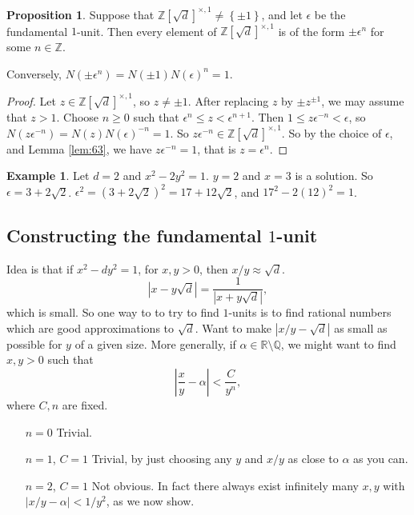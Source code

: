 \documentclass{article}
\newcommand{\Z}{\mathbb{Z}}
\newcommand{\Q}{\mathbb{Q}}
\newcommand{\R}{\mathbb{R}}
\newcommand{\rb}[1]{\left( #1 \right)}
\renewcommand{\sb}[1]{\left[ #1 \right]}
\newcommand{\cb}[1]{\left\{ #1 \right\}}
\newcommand{\abs}[1]{\left\lvert #1 \right\rvert}
\theoremstyle{definition}\newtheorem{definition}{Definition}
\theoremstyle{definition}\newtheorem{remark}[definition]{Remark}
\theoremstyle{definition}\newtheorem*{example}{Example}
\theoremstyle{definition}\newtheorem*{note}{Note}
\newtheorem{proposition}[definition]{Proposition}
\begin{document}
\begin{proposition}
Suppose that $ \Z\sb{\sqrt{d}}^{\times, 1} \ne \cb{\pm 1} $, and let $ \epsilon $ be the fundamental $ 1 $-unit. Then every element of $ \Z\sb{\sqrt{d}}^{\times, 1} $ is of the form $ \pm \epsilon^n $ for some $ n \in \Z $.
\end{proposition}

Conversely, $ N\rb{\pm \epsilon^n} = N\rb{\pm 1}N\rb{\epsilon}^n = 1 $.

\begin{proof}
Let $ z \in \Z\sb{\sqrt{d}}^{\times, 1} $, so $ z \ne \pm 1 $. After replacing $ z $ by $ \pm z^{\pm 1} $, we may assume that $ z > 1 $. Choose $ n \ge 0 $ such that $ \epsilon^n \le z < \epsilon^{n + 1} $. Then $ 1 \le z\epsilon^{-n} < \epsilon $, so $ N\rb{z\epsilon^{-n}} = N\rb{z}N\rb{\epsilon}^{-n} = 1 $. So $ z\epsilon^{-n} \in \Z\sb{\sqrt{d}}^{\times, 1} $. So by the choice of $ \epsilon $, and Lemma \ref{lem:63}, we have $ z\epsilon^{-n} = 1 $, that is $ z = \epsilon^n $.
\end{proof}

\begin{example}
Let $ d = 2 $ and $ x^2 - 2y^2 = 1 $. $ y = 2 $ and $ x = 3 $ is a solution. So $ \epsilon = 3 + 2\sqrt{2} $. $ \epsilon^2 = \rb{3 + 2\sqrt{2}}^2 = 17 + 12\sqrt{2} $, and $ 17^2 - 2\rb{12}^2  = 1 $.
\end{example}

\subsection{Constructing the fundamental $ 1 $-unit}

Idea is that if $ x^2 - dy^2 = 1 $, for $ x, y > 0 $, then $ x / y \approx \sqrt{d} $.
$$ \abs{x - y\sqrt{d}} = \dfrac{1}{\abs{x + y\sqrt{d}}}, $$
which is small. So one way to to try to find $ 1 $-units is to find rational numbers which are good approximations to $ \sqrt{d} $. Want to make $ \abs{x / y - \sqrt{d}} $ as small as possible for $ y $ of a given size. More generally, if $ \alpha \in \R \setminus \Q $, we might want to find $ x, y > 0 $ such that
$$ \abs{\dfrac{x}{y} - \alpha} < \dfrac{C}{y^n}, $$
where $ C, n $ are fixed.
\begin{itemize}[leftmargin=1in]
\item[$ n = 0 $] Trivial.
\item[$ n = 1 $, $ C = 1 $] Trivial, by just choosing any $ y $ and $ x / y $ as close to $ \alpha $ as you can.
\item[$ n = 2 $, $ C = 1 $] Not obvious. In fact there always exist infinitely many $ x, y $ with $ \abs{x / y - \alpha} < 1 / y^2 $, as we now show.
\end{itemize}
\end{document}
